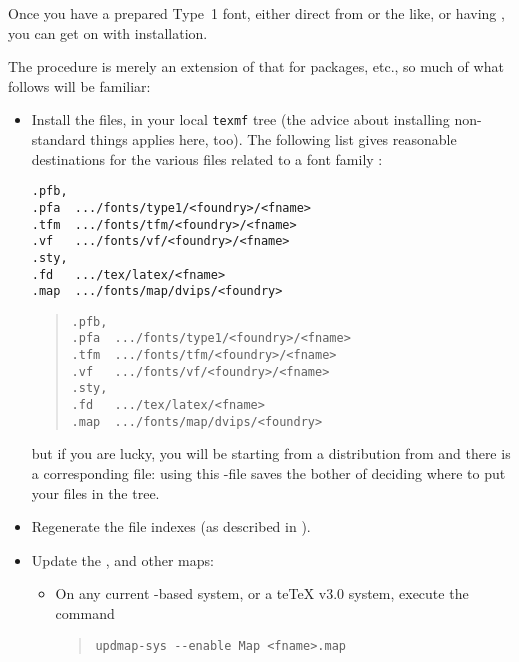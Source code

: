 
Once you have a prepared Type~1 font, either direct from 
or the like, or having ,
you can get on with installation.

The procedure is merely an extension of that for packages, etc., so
much of what follows will be familiar:
\begin{itemize}
\item Install the files, in your local \texttt{texmf} tree (the advice
  about installing non-standard things applies here, too).  The
  following list gives reasonable destinations for the various files
  related to a font family :
\begin{narrowversion}
\begin{verbatim}
.pfb,
.pfa  .../fonts/type1/<foundry>/<fname>
.tfm  .../fonts/tfm/<foundry>/<fname>
.vf   .../fonts/vf/<foundry>/<fname>
.sty,
.fd   .../tex/latex/<fname>
.map  .../fonts/map/dvips/<foundry>
\end{verbatim}
\end{narrowversion}
\begin{wideversion}
\begin{quote}
\begin{verbatim}
.pfb,
.pfa  .../fonts/type1/<foundry>/<fname>
.tfm  .../fonts/tfm/<foundry>/<fname>
.vf   .../fonts/vf/<foundry>/<fname>
.sty,
.fd   .../tex/latex/<fname>
.map  .../fonts/map/dvips/<foundry>
\end{verbatim}
\end{quote}
\end{wideversion}
  but if you are lucky, you will be starting from a distribution from
   and there is a corresponding  file:
  using this -file saves the bother of deciding where to put
  your files in the  tree.
\item Regenerate the file indexes (as described in
  ).
\item Update the , \PDFTeX{} and other maps:
  \begin{itemize}
  \item On any current \texlive{}-based system, or a te\TeX{} v3.0
    system, execute the command
\begin{quote}
\begin{verbatim}
updmap-sys --enable Map <fname>.map
\end{verbatim}
\end{quote}

\end{itemize}
\end{itemize}
